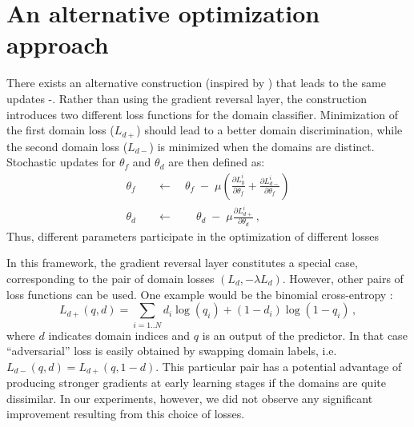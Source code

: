 \def\x{{\mathbf x}}
\def\f{{\mathbf f}}

\def\S{{\cal S}}
\def\T{{\cal T}}

\def\R{{\mathds R}}

\def\tf{{\theta_f}}
\def\td{{\theta_d}}
\def\ty{{\theta_y}}
\def\htf{{\hat\theta_f}}
\def\htd{{\hat\theta_d}}
\def\hty{{\hat\theta_y}}


\section{An alternative optimization approach}
\label{sect:appendix_alternative}

There exists an alternative construction (inspired by \cite{Goodfellow14}) that leads to the same updates -. Rather than using the gradient reversal layer, the construction introduces two different loss functions for the domain classifier. Minimization of the first domain loss ($ L_{d+} $) should lead to a better domain discrimination, while the second domain loss ($ L_{d-} $) is minimized when the domains are distinct. Stochastic updates for $ \theta_f $ and $ \theta_d $ are then defined as:
\begin{align*}
  \tf \quad &\longleftarrow \quad \tf \;-\; \mu \left(\frac{\partial L^i_y}{\partial \tf} + \frac{\partial L^i_{d-}}{\partial \tf} \right)\\
  \td \quad &\longleftarrow \qquad \td \;-\; \mu \frac{\partial L^i_{d+}}{\partial \td} \, ,
\end{align*}
Thus, different parameters participate in the optimization of different losses

In this framework, the gradient reversal layer constitutes a special case, corresponding  to the pair of domain losses $ (L_d, -\lambda L_d) $. However, other pairs of loss functions can be used. One example would be the binomial cross-entropy \cite{Goodfellow14}:
\begin{equation*}
  L_{d+}(q, d) = \sum_{i = 1..N} d_i \log(q_i) + (1 - d_i) \log(1 - q_i) \, ,
\end{equation*}
where $ d $ indicates domain indices and $ q $ is an output of the predictor. In that case ``adversarial'' loss is easily obtained by swapping domain labels, i.e.\ $ L_{d-}(q, d) = L_{d+}(q, 1 - d) $. This particular pair has a potential advantage of producing stronger gradients at early learning stages if the domains are quite dissimilar. In our experiments, however, we did not observe any significant improvement resulting from this choice of losses.

